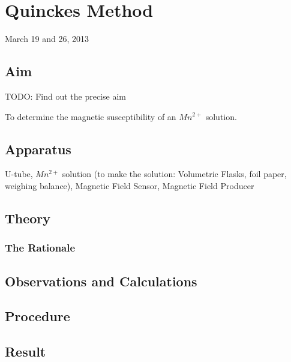 \chapter{Quinckes Method}
\begin{flushright}
March 19 and 26, 2013
\end{flushright}
\section{Aim}
	TODO: Find out the precise aim
	\par
	To determine the magnetic susceptibility of an $Mn^{2+}$ solution.
\section{Apparatus}
	U-tube, $Mn^{2+}$ solution (to make the solution: Volumetric Flasks, foil paper, weighing balance), Magnetic Field Sensor, Magnetic Field Producer

\section{Theory}
	\subsection{The Rationale}


\section{Observations and Calculations}	


\section{Procedure}

\section{Result}
